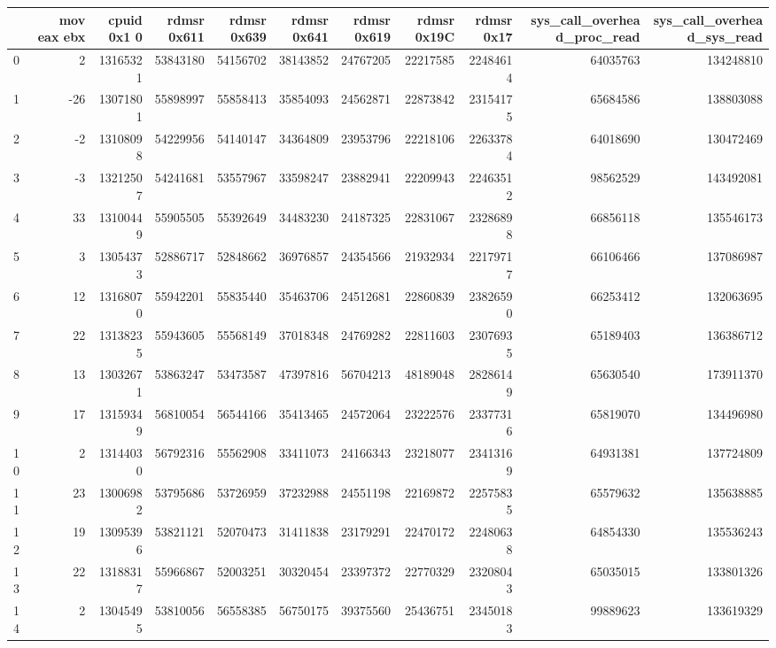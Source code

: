 \begin{tabular}{lrrrrrrrrrr}
\toprule
 & mov eax ebx & cpuid 0x1 0 & rdmsr 0x611 & rdmsr 0x639 & rdmsr 0x641 & rdmsr 0x619 & rdmsr 0x19C & rdmsr 0x17 & sys_call_overhead_proc_read & sys_call_overhead_sys_read \\
\midrule
0 & 2 & 13165321 & 53843180 & 54156702 & 38143852 & 24767205 & 22217585 & 22484614 & 64035763 & 134248810 \\
1 & -26 & 13071801 & 55898997 & 55858413 & 35854093 & 24562871 & 22873842 & 23154175 & 65684586 & 138803088 \\
2 & -2 & 13108098 & 54229956 & 54140147 & 34364809 & 23953796 & 22218106 & 22633784 & 64018690 & 130472469 \\
3 & -3 & 13212507 & 54241681 & 53557967 & 33598247 & 23882941 & 22209943 & 22463512 & 98562529 & 143492081 \\
4 & 33 & 13100449 & 55905505 & 55392649 & 34483230 & 24187325 & 22831067 & 23286898 & 66856118 & 135546173 \\
5 & 3 & 13054373 & 52886717 & 52848662 & 36976857 & 24354566 & 21932934 & 22179717 & 66106466 & 137086987 \\
6 & 12 & 13168070 & 55942201 & 55835440 & 35463706 & 24512681 & 22860839 & 23826590 & 66253412 & 132063695 \\
7 & 22 & 13138235 & 55943605 & 55568149 & 37018348 & 24769282 & 22811603 & 23076935 & 65189403 & 136386712 \\
8 & 13 & 13032671 & 53863247 & 53473587 & 47397816 & 56704213 & 48189048 & 28286149 & 65630540 & 173911370 \\
9 & 17 & 13159349 & 56810054 & 56544166 & 35413465 & 24572064 & 23222576 & 23377316 & 65819070 & 134496980 \\
10 & 2 & 13144030 & 56792316 & 55562908 & 33411073 & 24166343 & 23218077 & 23413169 & 64931381 & 137724809 \\
11 & 23 & 13006982 & 53795686 & 53726959 & 37232988 & 24551198 & 22169872 & 22575835 & 65579632 & 135638885 \\
12 & 19 & 13095396 & 53821121 & 52070473 & 31411838 & 23179291 & 22470172 & 22480638 & 64854330 & 135536243 \\
13 & 22 & 13188317 & 55966867 & 52003251 & 30320454 & 23397372 & 22770329 & 23208043 & 65035015 & 133801326 \\
14 & 2 & 13045495 & 53810056 & 56558385 & 56750175 & 39375560 & 25436751 & 23450183 & 99889623 & 133619329 \\
\bottomrule
\end{tabular}
